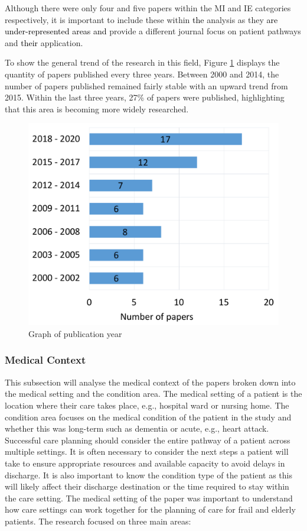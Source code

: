 \documentclass[../thesis.tex]{subfiles}
\begin{document}
Although there were only four and five papers within the MI and IE categories respectively, it is important to include these within \textcolor{black}{the} analysis as they \textcolor{black}{are under-represented areas and}
provide a different journal focus on patient pathways and \textcolor{black}{their} application.

To show the general trend of the research in this field, Figure \ref{fig:yearofpaper} displays the quantity of papers published every three years. Between 2000 and 2014, the number of papers published remained fairly stable with an upward trend from 2015. Within the last three years, 27\% of papers were published, highlighting that this area is becoming more widely researched. 

\begin{figure}[H]
\centering
  \includegraphics[scale=0.35]{Chapter2/Figures/Years2.pdf}
  \caption{Graph of publication year}
\label{fig:yearofpaper}    
\end{figure}

\subsubsection{Medical Context}
This subsection will analyse the medical context of the papers broken down into the medical setting and the condition area. The medical setting of a patient is the location where their care takes place, e.g., hospital ward or nursing home. The condition area focuses on the medical condition of the patient in the study and whether this was long-term such as dementia or acute, e.g., heart attack. Successful care planning should consider the entire pathway of a patient across multiple settings. It is often necessary to consider the next steps a patient will take to ensure appropriate resources and available capacity to avoid delays in discharge. It is also important to know the condition type of the patient as this will likely affect their discharge destination or the time required to stay within the care setting. 
 \label{Medical Setting}
The medical setting of the paper was important to understand how care settings can work together for the planning of care for frail and elderly patients. The research focused on three main areas:
\end{document}
